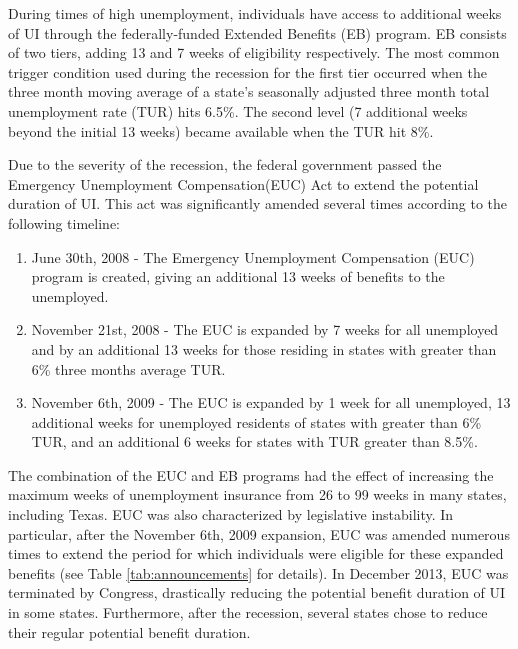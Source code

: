\documentclass[12pt]{article}
\begin{document}
\begin{spacing}{2}
During times of high unemployment, individuals have access to additional weeks of UI through the federally-funded Extended Benefits (EB) program. EB consists of two tiers, adding 13 and 7 weeks of eligibility respectively. The most common trigger condition used during the recession for the first tier occurred when the three month moving average of a state's seasonally adjusted three month total unemployment rate (TUR) hits 6.5\%. The second level (7 additional weeks beyond the initial 13 weeks) became available when the TUR hit 8\%.\footnotemark 
{}

Due to the severity of the recession, the federal government passed the Emergency Unemployment Compensation(EUC) Act to extend the potential duration of UI. This act was significantly amended several times according to the following timeline:
\begin{enumerate}
\item June 30th, 2008 - The Emergency Unemployment Compensation (EUC) program is created, giving an additional 13 weeks of benefits to the unemployed.

\item November 21st, 2008 - The EUC is expanded by 7 weeks for all unemployed and by an additional 13 weeks for those residing in states with greater than 6\% three months average TUR.

\item November 6th, 2009 - The EUC is expanded by 1 week for all unemployed, 13 additional weeks for unemployed residents of states with greater than 6\% TUR, and an additional 6 weeks for states with TUR greater than 8.5\%.
\end{enumerate}

The combination of the EUC and EB programs had the effect of increasing the maximum weeks of unemployment insurance from 26 to 99 weeks in many states, including Texas. EUC was also characterized by legislative instability. In particular, after the November 6th, 2009 expansion, EUC was amended numerous times to extend the period for which individuals were eligible for these expanded benefits (see Table \ref{tab:announcements} for details). In December 2013, EUC was terminated by Congress, drastically reducing the potential benefit duration of UI in some states. Furthermore, after the recession, several states chose to reduce their regular potential benefit duration.


\end{spacing}
\end{document}
